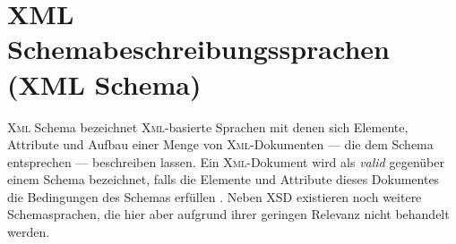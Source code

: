 \section{XML Schemabeschreibungssprachen (XML Schema)}
\label{sec:xmlschema}

\textsc{Xml} Schema bezeichnet \textsc{Xml}-basierte Sprachen mit denen sich Elemente, Attribute und Aufbau einer Menge von \textsc{Xml}-Dokumenten --- die dem Schema entsprechen --- beschreiben lassen. 
Ein \textsc{Xml}-Dokument wird als \emph{valid} gegenüber einem Schema bezeichnet, falls die Elemente und Attribute dieses Dokumentes die Bedingungen des Schemas erfüllen \cite{taxonomyXMLSchema}.
Neben \gls{XSD} existieren noch weitere Schemasprachen, die hier aber aufgrund ihrer geringen Relevanz nicht behandelt werden. 



%